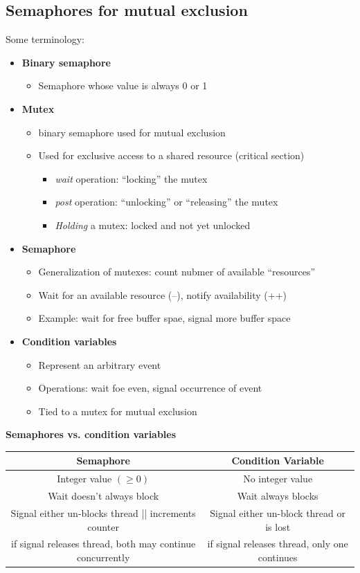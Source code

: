 \documentclass[a4paper]{article}
\begin{document}
\subsection{Semaphores for mutual exclusion} %
\label{sub:Semaphores for mutual exclusion}
Some terminology:
\begin{itemize}
  \item {\bf Binary semaphore}
    \begin{itemize}
      \item Semaphore whose value is always 0 or 1
    \end{itemize}
  \item {\bf Mutex }
    \begin{itemize}
      \item binary semaphore used for mutual exclusion
      \item Used for exclusive access to a shared resource (critical section)
        \begin{itemize}
          \item \emph{wait} operation: ``locking'' the mutex
          \item \emph{post} operation: ``unlocking'' or ``releasing'' the mutex
          \item \emph{Holding} a mutex: locked and not yet unlocked
        \end{itemize}
    \end{itemize}
  \item {\bf Semaphore}
    \begin{itemize}
      \item Generalization of mutexes: count nubmer of available ``resources''
      \item Wait for an available resource (--), notify availability (++)
      \item Example: wait for free buffer spae, signal more buffer space
    \end{itemize}
  \item {\bf Condition variables}
    \begin{itemize}
      \item Represent an arbitrary event
      \item Operations: wait foe even, signal occurrence of event 
      \item Tied to a mutex for mutual exclusion
    \end{itemize}
\end{itemize}
{\bf Semaphores vs. condition variables} \\
\begin{tabular}{| c | c |}
  \hline
 {\bf Semaphore} & {\bf Condition Variable} \\
  \hline
 Integer value $(\geq 0)$ & No integer value \\
  \hline
 Wait doesn't always block & Wait always blocks \\
  \hline
 Signal either un-blocks thread || increments counter & Signal either un-block thread or is lost \\
  \hline
 if signal releases thread, both may continue concurrently & if signal releases thread, only one continues\\
  \hline
\end{tabular}
\end{document}
